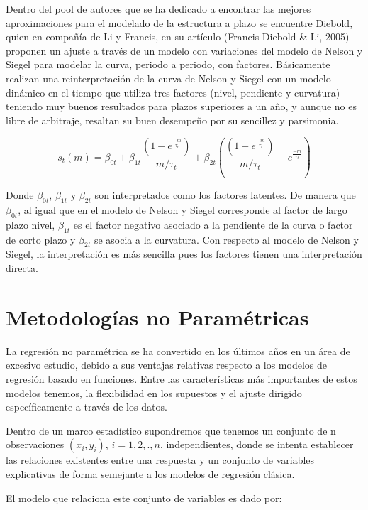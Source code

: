 \documentclass[
  12pt,
]{krantz}
\begin{document}
Dentro del pool de autores que se ha dedicado a encontrar las mejores aproximaciones para el modelado de la estructura a plazo se encuentre Diebold, quien en compañía de Li y Francis, en su artículo (Francis Diebold \& Li, 2005) proponen un ajuste a través de un modelo con variaciones del modelo de Nelson y Siegel para modelar la curva, periodo a periodo, con factores. Básicamente realizan una reinterpretación de la curva de Nelson y Siegel con un modelo dinámico en el tiempo que utiliza tres factores (nivel, pendiente y curvatura) teniendo muy buenos resultados para plazos superiores a un año, y aunque no es libre de arbitraje, resaltan su buen desempeño por su sencillez y parsimonia.

\[\displaystyle{s_t(m) = \beta_{0t}+ \beta_{1t}\frac{\left(1-e^\frac{-m}{\tau_t}\right)}{m/\tau_t} + \beta_{2t} \left(\frac{\left(1-e^\frac{-m}{\tau_t}\right)}{m/\tau_t} -  e^\frac{-m}{\tau_t}\right)}\]

Donde \(\beta_{0t}\), \(\beta_{1t}\) y \(\beta_{2t}\) son interpretados como los factores latentes. De manera que \(\beta_{0t}\), al igual que en el modelo de Nelson y Siegel corresponde al factor de largo plazo nivel, \(\beta_{1t}\) es el factor negativo asociado a la pendiente de la curva o factor de corto plazo y \(\beta_{2t}\) se asocia a la curvatura. Con respecto al modelo de Nelson y Siegel, la interpretación es más sencilla pues los factores tienen una interpretación directa.

\hypertarget{metodologias-no-parametricas}{%
\section{Metodologías no Paramétricas}\label{metodologias-no-parametricas}}

La regresión no paramétrica se ha convertido en los últimos años en un
área de excesivo estudio, debido a sus ventajas relativas respecto a los
modelos de regresión basado en funciones. Entre las características más
importantes de estos modelos tenemos, la flexibilidad en los supuestos y
el ajuste dirigido específicamente a través de los datos.

Dentro de un marco estadístico supondremos que tenemos un conjunto
de n observaciones \((x_{i}, y_{i})\), \(i= 1, 2,., n\), independientes, donde se intenta
establecer las relaciones existentes entre una respuesta y un conjunto de
variables explicativas de forma semejante a los modelos de regresión
clásica.

El modelo que relaciona este conjunto de variables es dado por:
\end{document}

